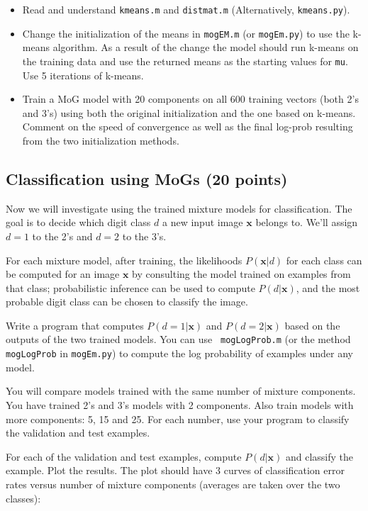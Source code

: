 \documentclass[12pt]{article}
\newcommand{\xx}{\mathbf{x}}
\begin{document}
\begin{itemize}
\item Read and understand {\tt kmeans.m} and {\tt distmat.m} (Alternatively,
{\tt kmeans.py}).

\item Change the initialization of the means in {\tt mogEM.m} (or {\tt mogEm.py}) to use the k-means algorithm.
As a result of the change the model should run k-means on the training data and use the returned means as the
starting values for {\tt mu}.  Use 5 iterations of k-means.

\item Train a MoG model with 20 components on all 600 training vectors (both 2's and 3's) using
both the original initialization and the one based on k-means.
Comment on the speed of convergence as well as the final log-prob resulting from
the two initialization methods.



\end{itemize}



\subsection{Classification using MoGs (20 points)}

Now we will investigate using the trained mixture models for
classification. The goal is to decide which digit class $d$ a new
input image $\xx$ belongs to.  We'll assign $d=1$ to the 2's and
$d=2$ to the 3's.

For each mixture model, after training, the likelihoods $P(\xx|d)$ for
each class can be computed for an image $\xx$ by consulting
the model trained on examples from that class; probabilistic
inference can be used to compute $P(d|\xx)$, and the most probable
digit class can be chosen to classify the image.

Write a program that computes $P(d=1|\xx)$ and $P(d=2|\xx)$ based
on the outputs of the two trained models. You can use {\tt
mogLogProb.m} (or the method {\tt mogLogProb} in {\tt mogEm.py}) to compute the
log probability of examples under any model.

You will compare models trained with the same number of mixture components. You
have trained 2's and 3's models with 2 components.  Also train models with more
components: 5, 15 and 25.  For each number, use your program to classify
the validation and test examples.

For each of the validation and test examples, compute $P(d|\xx)$ and classify the
example. Plot the results. The plot should have 3 curves of
classification error rates versus number of mixture components
(averages are taken over the two classes):
\end{document}
